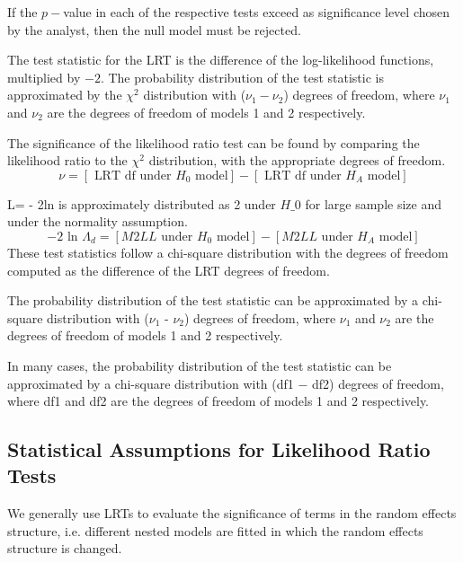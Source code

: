 \documentclass[12pt, a4paper]{article}
\begin{document}
If the $p-$value in each of the respective tests exceed as significance level chosen by the analyst, then the null model must be rejected.

\bigskip

The test statistic for the LRT is the difference of the log-likelihood functions, multiplied by $-2$.
The probability distribution of the test statistic is approximated by the $\chi^2$ distribution with ($\nu_{1} - \nu_{2}$) degrees of freedom, where $\nu_{1}$  and $\nu_{2}$ are the degrees of freedom of models 1 and 2 respectively.

The significance of the likelihood ratio test can be found by comparing the likelihood ratio to the $\chi^2$ distribution, with the appropriate degrees of freedom.
\begin{equation}
\nu = [\mbox{ LRT df under }H_{0} \mbox{ model}] - [\mbox{ LRT df under }H_{A} \mbox{ model}]
\end{equation}


L= - 2ln is approximately distributed as 2 under $H\_0$ for large sample size and under the normality assumption.
\begin{equation}
-2\mbox{ ln }\Lambda_{d} =  [ M2LL \mbox{ under }H_{0} \mbox{ model}] - [ M2LL \mbox{ under }H_{A} \mbox{ model}]
\end{equation}
These test statistics follow a chi-square distribution with the degrees of freedom computed as the difference of the LRT degrees of freedom.

\bigskip

The probability distribution of the test statistic can be approximated by a chi-square distribution with ($\nu_1$ - $\nu_2$) degrees of freedom, where $\nu_1$ and $\nu_2$ are the degrees of freedom of models 1 and 2 respectively.

\bigskip

In many cases, the probability distribution of the test statistic can be approximated by a chi-square distribution with (df1 − df2) degrees of freedom, where df1 and df2 are the degrees of freedom of models 1 and 2 respectively.\\
\subsection{Statistical Assumptions for Likelihood Ratio Tests}
	
We generally use LRTs to evaluate the significance of terms in the random effects structure, i.e. different nested models are fitted in which the random effects structure is changed.
\end{document}
